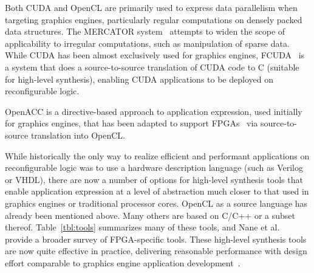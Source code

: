 Both CUDA and OpenCL are primarily used to express data parallelism
when targeting graphics engines, particularly regular computations
on densely packed data structures. The MERCATOR system~\cite{cb17}
attempts to widen the scope of applicability to irregular computations,
such as manipulation of sparse data.
While CUDA has been almost exclusively used for graphics engines,
FCUDA~\cite{pgs+13} is a system that does a source-to-source translation
of CUDA code to C (suitable for high-level synthesis), enabling CUDA
applications to be deployed on reconfigurable logic.

OpenACC is a directive-based approach to application expression,
used initially for graphics engines, that has been adapted to support
FPGAs~\cite{lkv16} via source-to-source translation into OpenCL.

While historically the only way to realize efficient and performant
applications on reconfigurable logic was to use a hardware description
language (such as Verilog or VHDL), there are now a number of
options for high-level synthesis tools that enable application expression
at a level of abstraction much closer to that used in graphics engines
or traditional processor cores.  OpenCL as a source language has already
been mentioned above. Many others are based on C/C++ or a subset thereof.
Table~\ref{tbl:tools} summarizes many of these tools,
and Nane et al.~\cite{nsp+16}
provide a broader survey of FPGA-specific tools.
These high-level synthesis tools are now quite effective in
practice, delivering reasonable performance with design effort
comparable to graphics engine application
development~\cite{zms+16,cc19,kenter19}.

